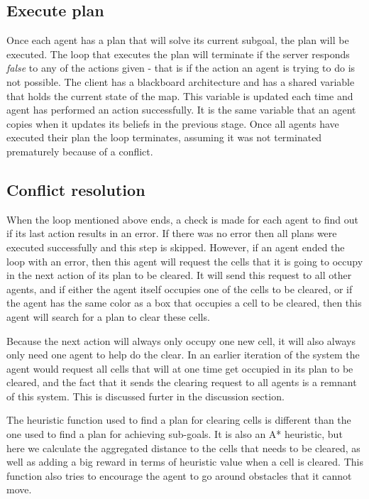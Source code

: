 \documentclass[letterpaper]{article}
\begin{document}
\subsection{Execute plan}
Once each agent has a plan that will solve its current subgoal, the plan will be executed. The loop that executes the plan will terminate if the server responds \textit{false} to any of the actions given - that is if the action an agent is trying to do is not possible. The client has a blackboard architecture and has a shared variable that holds the current state of the map. This variable is updated each time and agent has performed an action successfully. It is the same variable that an agent copies when it updates its beliefs in the previous stage. Once all agents have executed their plan the loop terminates, assuming it was not terminated prematurely because of a conflict.

\subsection{Conflict resolution}
When the loop mentioned above ends, a check is made for each agent to find out if its last action results in an error. If there was no error then all plans were executed successfully and this step is skipped. However, if an agent ended the loop with an error, then this agent will request the cells that it is going to occupy in the next action of its plan to be cleared. It will send this request to all other agents, and if either the agent itself occupies one of the cells to be cleared, or if the agent has the same color as a box that occupies a cell to be cleared, then this agent will search for a plan to clear these cells.

Because the next action will always only occupy one new cell, it will also always only need one agent to help do the clear. In an earlier iteration of the system the agent would request all cells that will at one time get occupied in its plan to be cleared, and the fact that it sends the clearing request to all agents is a remnant of this system. This is discussed furter in the discussion section.

The heuristic function used to find a plan for clearing cells is different than the one used to find a plan for achieving sub-goals. It is also an A* heuristic, but here we calculate the aggregated distance to the cells that needs to be cleared, as well as adding a big reward in terms of heuristic value when a cell is cleared. This function also tries to encourage the agent to go around obstacles that it cannot move.
\end{document}
